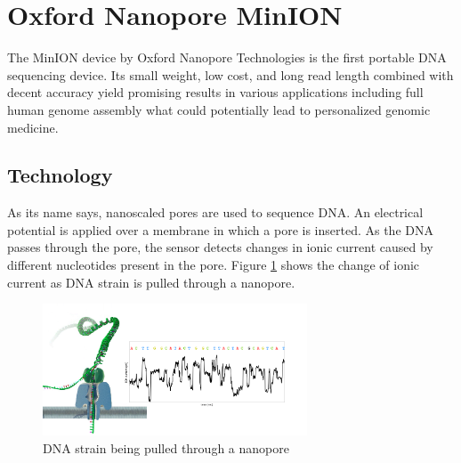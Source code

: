 \documentclass[times, utf8, diplomski, numeric, english]{fer}
\begin{document}
\section{Oxford Nanopore MinION}

The MinION device by Oxford Nanopore Technologies is the first portable DNA sequencing device. Its small weight, low cost, and long read length combined with decent accuracy yield promising results in various applications including full human genome assembly \cite{human_seq} what could potentially lead to personalized genomic medicine.

\subsection{Technology}
As its name says, nanoscaled pores are used to sequence DNA. An electrical potential is applied over a membrane in which a  pore is inserted. 
As the DNA passes through the pore, the sensor detects changes in ionic current caused by different nucleotides present in the pore. Figure \ref{fg:nanopore} shows the change of ionic current as DNA strain is pulled through a nanopore.

\begin{figure}[!ht]
	\begin{center}
		\includegraphics[width=0.7\textwidth]{./imgs/nanopore.png}
		
		\caption[DNA strain being pulled through a nanopore]{DNA strain being pulled through a nanopore \protect\footnotemark}
		\label{fg:nanopore}
	\end{center}
\end{figure}
\end{document}
